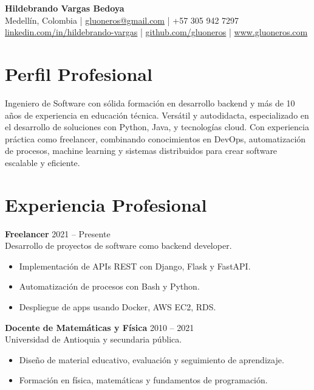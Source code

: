 \documentclass[a4paper,10pt]{article}
\begin{document}
	
	\begin{center}
		{\Huge \textbf{Hildebrando Vargas Bedoya}} \\
		\vspace{4pt}
		Medellín, Colombia \quad | \quad
		\href{mailto:gluoneros@gmail.com}{gluoneros@gmail.com} \quad | \quad
		+57 305 942 7297 \\
		\href{https://linkedin.com/in/hildebrando-vargas}{linkedin.com/in/hildebrando-vargas} \quad | \quad
		\href{https://github.com/gluoneros}{github.com/gluoneros} \quad | \quad
		\href{https://www.gluoneros.com}{www.gluoneros.com}
	\end{center}
	
	\vspace{0.5em}
	
	\section*{Perfil Profesional}
	Ingeniero de Software con sólida formación en desarrollo backend y más de 10 años de experiencia en educación técnica. Versátil y autodidacta, especializado en el desarrollo de soluciones con Python, Java, y tecnologías cloud. Con experiencia práctica como freelancer, combinando conocimientos en DevOps, automatización de procesos, machine learning y sistemas distribuidos para crear software escalable y eficiente.
	
	\section*{Experiencia Profesional}
	\textbf{Freelancer} \hfill 2021 -- Presente \\
	Desarrollo de proyectos de software como backend developer. 
	\begin{itemize}
		\item Implementación de APIs REST con Django, Flask y FastAPI.
		\item Automatización de procesos con Bash y Python.
		\item Despliegue de apps usando Docker, AWS EC2, RDS.
	\end{itemize}
	
	\textbf{Docente de Matemáticas y Física} \hfill 2010 -- 2021 \\
	Universidad de Antioquia y secundaria pública. 
	\begin{itemize}
		\item Diseño de material educativo, evaluación y seguimiento de aprendizaje.
		\item Formación en física, matemáticas y fundamentos de programación.
	\end{itemize}
	
\end{document}
